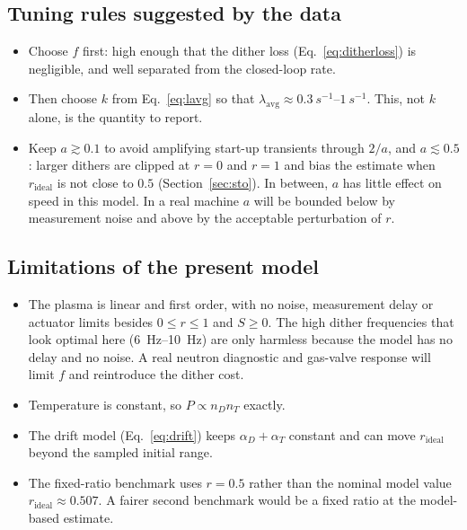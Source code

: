\documentclass[11pt,a4paper]{article}
\newcommand{\nD}{n_D}
\newcommand{\nT}{n_T}
\newcommand{\rid}{r_\mathrm{ideal}}
\newcommand{\lavg}{\lambda_\mathrm{avg}}
\begin{document}
\subsection{Tuning rules suggested by the data}
\begin{itemize}
  \item Choose $f$ first: high enough that the dither loss (Eq.~\eqref{eq:ditherloss}) is negligible, and well separated from the closed-loop rate.
  \item Then choose $k$ from Eq.~\eqref{eq:lavg} so that $\lavg\approx\SIrange{0.3}{1}{s^{-1}}$. This, not $k$ alone, is the quantity to report.
  \item Keep $a\gtrsim0.1$ to avoid amplifying start-up transients through $2/a$, and $a\lesssim0.5$: larger dithers are clipped at $r=0$ and $r=1$ and bias the estimate when $\rid$ is not close to $0.5$ (Section~\ref{sec:sto}). In between, $a$ has little effect on speed in this model. In a real machine $a$ will be bounded below by measurement noise and above by the acceptable perturbation of $r$.
\end{itemize}

\subsection{Limitations of the present model}
\begin{itemize}
  \item The plasma is linear and first order, with no noise, measurement delay or actuator limits besides $0\le r\le1$ and $S\ge0$. The high dither frequencies that look optimal here (\SIrange{6}{10}{Hz}) are only harmless because the model has no delay and no noise. A real neutron diagnostic and gas-valve response will limit $f$ and reintroduce the dither cost.
  \item Temperature is constant, so $P\propto\nD\nT$ exactly.
  \item The drift model (Eq.~\eqref{eq:drift}) keeps $\alpha_D+\alpha_T$ constant and can move $\rid$ beyond the sampled initial range.
  \item The fixed-ratio benchmark uses $r=0.5$ rather than the nominal model value $\rid\approx0.507$. A fairer second benchmark would be a fixed ratio at the model-based estimate.
\end{itemize}
\end{document}
